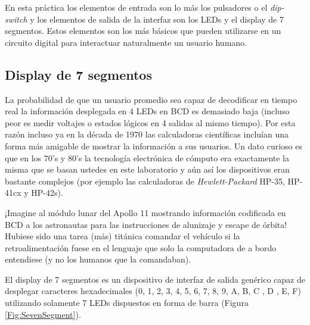 En esta práctica los elementos de entrada son lo más los pulsadores o el \emph{dip-switch} y los elementos de salida de la interfaz son los LEDs y el display de 7 segmentos.
Estos elementos son los más básicos que pueden utilizarse en un circuito digital para interactuar naturalmente un usuario humano.

\subsection{Display de 7 segmentos}
La probabilidad de que un usuario promedio sea capaz de decodificar en tiempo real la información desplegada en 4 LEDs en BCD 
es demasiado baja (incluso peor es medir voltajes o estados lógicos en 4 salidas al mismo tiempo).
Por esta razón incluso ya en la década de 1970 las calculadoras científicas incluían una forma más amigable de mostrar
la información a sus usuarios. Un dato curioso es que en los 70's y 80's la tecnología electrónica de cómputo era exactamente la misma
que se basan ustedes en este laboratorio y aún así los dispositivos eran bastante complejos (por ejemplo las calculadoras de \emph{Hewlett-Packard} HP-35, HP-41cx y HP-42s).

¡Imagine al módulo lunar del Apollo 11 mostrando información codificada en BCD a los astronautas para las instrucciones de alunizaje y escape de órbita!
Hubiese sido una tarea (más) titánica comandar el vehículo si la retroalimentación fuese en el lenguaje que solo la computadora de a bordo entendiese (y no los humanos que la comandaban).

\vspace{14pt}

El display de 7 segmentos es un dispositivo de interfaz de salida genérico capaz de desplegar caracteres hexadecimales (0, 1, 2, 3, 4, 5, 6, 7, 8, 9, A, B, C , D , E, F) utilizando solamente
7 LEDs dispuestos en forma de barra (Figura \ref{Fig:SevenSegment}).

